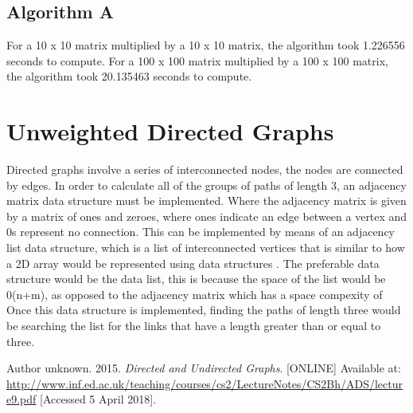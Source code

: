 \documentclass[twocolumn]{IEEEtran}
\begin{document}
	\subsection{Algorithm A}
	For a 10 x 10 matrix multiplied by a 10 x 10 matrix, the algorithm took 1.226556 seconds to compute.
	For a 100 x 100 matrix multiplied by a 100 x 100 matrix, the algorithm took 20.135463 seconds to compute.
	
	
	\section{Unweighted Directed Graphs}
	Directed graphs involve a series of interconnected nodes, the nodes are connected by edges. In order to calculate all of the groups of paths of length 3, an adjacency matrix data structure must be implemented. Where the adjacency matrix is given by a matrix of ones and zeroes, where ones indicate an edge between a vertex and 0s represent no connection. This can be implemented by means of an adjacency list data structure, which is a list of interconnected vertices that is similar to how a 2D array would be represented using data structures \cite{graph}. The preferable data structure would be the data list, this is because the space of the list would be 0(n+m), as opposed to the adjacency matrix which has a space  compexity of %
	Once this data structure is implemented, finding the paths of length three would be searching the list for the links that have a length greater than or equal to three.

	\begin{thebibliography}{12}
		Author unknown. 2015. \textit{Directed and Undirected Graphs}. [ONLINE] Available at: \url{http://www.inf.ed.ac.uk/teaching/courses/cs2/LectureNotes/CS2Bh/ADS/lecture9.pdf} [Accessed 5 April 2018].
	\end{thebibliography}
\end{document}
